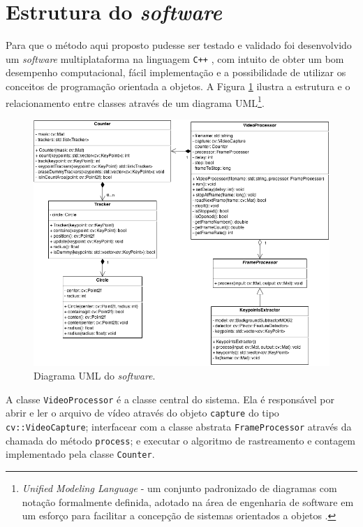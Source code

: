 

\section{Estrutura do \textit{software}} %
\label{sec:estrutura_do_software}

Para que o método aqui proposto pudesse ser testado e validado foi desenvolvido um \textit{software} multiplataforma na linguagem  \verb!C++! \citep{cplusplus:2013:online}, com intuito de obter um bom desempenho computacional, fácil implementação e a possibilidade de utilizar os conceitos de programação orientada a objetos. A Figura \ref{fig:uml} ilustra a estrutura e o relacionamento entre classes através de um diagrama UML\footnote{\textit{Unified Modeling Language} - um conjunto padronizado de diagramas com notação formalmente definida, adotado na área de engenharia de software em um esforço para facilitar a concepção de sistemas orientados a objetos \citep{aguiar2008thesis}.}.

\begin{figure}[ht]
  \begin{center}
    \includegraphics[scale=0.55]{imgs/uml_pfc.png}
  \end{center}
  \caption{Diagrama UML do \textit{software}.}
  \label{fig:uml}
\end{figure}

A classe \verb!VideoProcessor! é a classe central do sistema. Ela é responsável por abrir e ler o arquivo de vídeo através do objeto \verb!capture! do tipo \verb!cv::VideoCapture!; interfacear com a classe abstrata \verb!FrameProcessor! através da chamada do método \verb!process!; e executar o algoritmo de rastreamento e contagem implementado pela classe \verb!Counter!.

